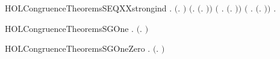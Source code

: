 \newcommand{\HOLCongruenceTheoremsSEQXXrules}{\UseVerbatim{HOLCongruenceTheoremsSEQXXrules}}
\begin{SaveVerbatim}{HOLCongruenceTheoremsSEQXXstrongind}
\HOLTokenTurnstile{} \HOLSymConst{\HOLTokenForall{}}.
        \ensuremath{(}\HOLTokenLambda{}. \ensuremath{)} \HOLSymConst{\HOLTokenConj{}} \ensuremath{(}\HOLSymConst{\HOLTokenForall{}}.  \ensuremath{(}\HOLTokenLambda{}. \ensuremath{)}\ensuremath{)} \HOLSymConst{\HOLTokenConj{}}
       \ensuremath{(}\HOLSymConst{\HOLTokenForall{}} .   \HOLSymConst{\HOLTokenConj{}}   \HOLSymConst{\HOLTokenImp{}}  \ensuremath{(}\HOLTokenLambda{}. \HOLSymConst{\ensuremath{\ldotp}} \ensuremath{)}\ensuremath{)} \HOLSymConst{\HOLTokenConj{}}
       \ensuremath{(}\HOLSymConst{\HOLTokenForall{}} .
              \HOLSymConst{\HOLTokenConj{}}   \HOLSymConst{\HOLTokenConj{}}   \HOLSymConst{\HOLTokenConj{}}   \HOLSymConst{\HOLTokenImp{}}
             \ensuremath{(}\HOLTokenLambda{}.   \HOLSymConst{\ensuremath{+}}  \ensuremath{)}\ensuremath{)} \HOLSymConst{\HOLTokenImp{}}
       \HOLSymConst{\HOLTokenForall{}}.   \HOLSymConst{\HOLTokenImp{}}  
\end{SaveVerbatim}
\newcommand{\HOLCongruenceTheoremsSEQXXstrongind}{\UseVerbatim{HOLCongruenceTheoremsSEQXXstrongind}}
\begin{SaveVerbatim}{HOLCongruenceTheoremsSGOne}
\HOLTokenTurnstile{} \HOLSymConst{\HOLTokenForall{}}.  \ensuremath{(}\HOLTokenLambda{}. \ensuremath{)}
\end{SaveVerbatim}
\newcommand{\HOLCongruenceTheoremsSGOne}{\UseVerbatim{HOLCongruenceTheoremsSGOne}}
\begin{SaveVerbatim}{HOLCongruenceTheoremsSGOneZero}
\HOLTokenTurnstile{} \HOLSymConst{\HOLTokenForall{}} .  \ensuremath{(}\HOLTokenLambda{}. \HOLConst{\ensuremath{\tau}}\HOLSymConst{\ensuremath{\ldotp}}  \HOLSymConst{\ensuremath{+}} \HOLConst{\ensuremath{\tau}}\HOLSymConst{\ensuremath{\ldotp}} \ensuremath{)} \HOLSymConst{\HOLTokenImp{}}   \HOLSymConst{\HOLTokenConj{}}  
\end{SaveVerbatim}
